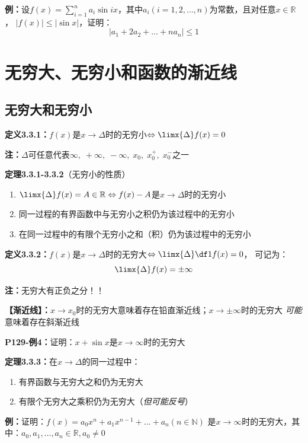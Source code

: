 {\bf 例：}设$f(x)=\sum\limits_{i=1}^na_i\sin
ix$，其中$a_i(i=1,2,\ldots,n)$为常数，且对任意$x\in\mathbb{R}$， $|f(x)|\leq |\sin x|$，证明：
$$\left|a_1+2a_2+\ldots+na_n\right|\leq 1$$

\section{无穷大、无穷小和函数的渐近线}

\subsection{无穷大和无穷小}

{\bf 定义3.3.1：}$f(x)$是$x\to\Delta$时的无穷小$\Leftrightarrow\limx{\Delta}f(x)=0$

{\bf 注：}$\Delta$可任意代表$\infty,\;+\infty,\;-\infty,\;x_0,\;x_0^+,\;x_0^-$之一

{\bf 定理3.3.1-3.3.2}（无穷小的性质）
\begin{enumerate}[(1)]
  \setlength{\itemindent}{1cm}
  \item $\limx{\Delta}f(x)=A\in\mathbb{R}\Leftrightarrow
  f(x)-A$是$x\to\Delta$时的无穷小
  \item 同一过程的有界函数中与无穷小之积仍为该过程中的无穷小
  \item 在同一过程中的有限个无穷小之和（积）仍为该过程中的无穷小
\end{enumerate}

{\bf 定义3.3.2：}$f(x)$是$x\to\Delta$时的无穷大$\Leftrightarrow\limx{\Delta}\df 1{f(x)}=0$，
可记为：
$$\limx{\Delta}f(x)=\pm\infty$$

{\bf 注：}无穷大有正负之分！！

{\bf 【渐近线】：}$x\to x_0$时的无穷大意味着存在铅直渐近线；$x\to\pm\infty$时的无穷大
{\it 可能}意味着存在斜渐近线

{\bf P129-例4：}证明：$x+\sin x$是$x\to\infty$时的无穷大

{\bf 定理3.3.3：}在$x\to\Delta$的同一过程中：
\begin{enumerate}[(1)]
  \setlength{\itemindent}{1cm}
  \item 有界函数与无穷大之和仍为无穷大
  \item 有限个无穷大之乘积仍为无穷大（{\it 但可能反号}）
\end{enumerate}

{\bf 例：}证明：$f(x)=a_0x^n+a_1x^{n-1}+\ldots+a_n(n\in\mathbb{N})$
是$x\to\infty$时的无穷大，其中：$a_0,a_1,\ldots,a_n\in\mathbb{R},a_0\ne 0$

